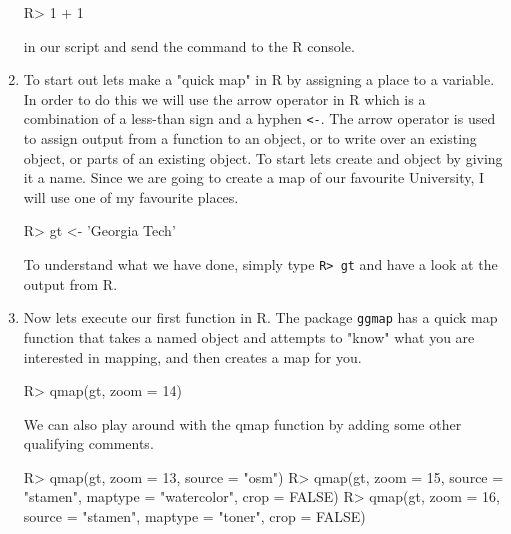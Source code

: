 \documentclass{article}
\newenvironment{Schunk}{}{}
\newcommand{\code}[1]{\texttt{#1}}
\newcommand{\pkg}[1]{\mbox{\texttt{#1}}}
\newcommand{\proglang}[1]{\textsf{#1}}
\begin{document}
\begin{enumerate}[leftmargin=15mm]
\begin{Schunk}
\begin{Sinput}
R>  1 + 1
\end{Sinput}
\end{Schunk}

in our script and send the command to the \proglang{R} console.

\item To start out lets make a "quick map" in R by assigning a place to a variable.  In order to do this we will use the arrow operator in \proglang{R} which is a combination of a less-than sign and a hyphen \code{\textless -}.  The arrow operator is used to assign output from a function to an object, or to write over an existing object, or parts of an existing object.  To start lets create and object by giving it a name.  Since we are going to create a map of our favourite University, I will use one of my favourite places.

\begin{Schunk}
\begin{Sinput}
R>  gt <- 'Georgia Tech'
\end{Sinput}
\end{Schunk}

To understand what we have done, simply type \code{R> gt} and have a look at the output from \proglang{R}.

\item Now lets execute our first function in \proglang{R}.  The package \pkg{ggmap} has a quick map function that takes a named object and attempts to "know" what you are interested in mapping, and then creates a map for you.

\begin{Schunk}
\begin{Sinput}
R>  qmap(gt, zoom = 14)
\end{Sinput}
\end{Schunk}

We can also play around with the qmap function by adding some other qualifying comments.

\begin{Schunk}
\begin{Sinput}

R>  qmap(gt, zoom = 13, source = "osm")
R>  qmap(gt, zoom = 15, source = "stamen", maptype = 
"watercolor", crop = FALSE)
R>  qmap(gt, zoom = 16, source = "stamen", maptype = 
"toner", crop = FALSE)

\end{Sinput}
\end{Schunk}


\end{enumerate}
\end{document}
